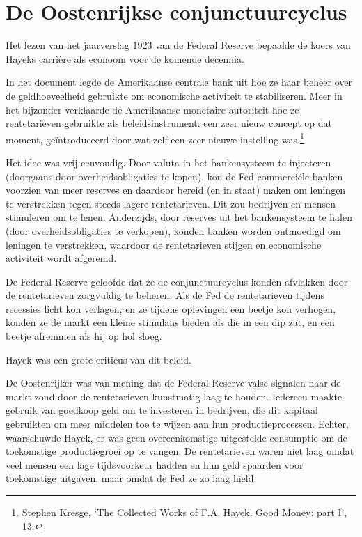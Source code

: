 \documentclass[
  a5paper,
  smalldemyvopaper,11pt,twoside,onecolumn,openright,extrafontsizes]{memoir}
\begin{document}
\section{De Oostenrijkse
conjunctuurcyclus}\label{de-oostenrijkse-conjunctuurcyclus}

Het lezen van het jaarverslag 1923 van de Federal Reserve bepaalde de
koers van Hayeks carrière als econoom voor de komende decennia.

In het document legde de Amerikaanse centrale bank uit hoe ze haar
beheer over de geldhoeveelheid gebruikte om economische activiteit te
stabiliseren. Meer in het bijzonder verklaarde de Amerikaanse monetaire
autoriteit hoe ze rentetarieven gebruikte als beleidsinstrument: een
zeer nieuw concept op dat moment, geïntroduceerd door wat zelf een zeer
nieuwe instelling was.\footnote{Stephen Kresge, `The Collected Works of
  F.A. Hayek, Good Money: part I', 13.}

Het idee was vrij eenvoudig. Door valuta in het bankensysteem te
injecteren (doorgaans door overheidsobligaties te kopen), kon de Fed
commerciële banken voorzien van meer reserves en daardoor bereid (en in
staat) maken om leningen te verstrekken tegen steeds lagere
rentetarieven. Dit zou bedrijven en mensen stimuleren om te lenen.
Anderzijds, door reserves uit het bankensysteem te halen (door
overheidsobligaties te verkopen), konden banken worden ontmoedigd om
leningen te verstrekken, waardoor de rentetarieven stijgen en
economische activiteit wordt afgeremd.

De Federal Reserve geloofde dat ze de conjunctuurcyclus konden afvlakken
door de rentetarieven zorgvuldig te beheren. Als de Fed de rentetarieven
tijdens recessies licht kon verlagen, en ze tijdens oplevingen een
beetje kon verhogen, konden ze de markt een kleine stimulans bieden als
die in een dip zat, en een beetje afremmen als hij op hol sloeg.

Hayek was een grote criticus van dit beleid.

De Oostenrijker was van mening dat de Federal Reserve valse signalen
naar de markt zond door de rentetarieven kunstmatig laag te houden.
Iedereen maakte gebruik van goedkoop geld om te investeren in bedrijven,
die dit kapitaal gebruikten om meer middelen toe te wijzen aan hun
productieprocessen. Echter, waarschuwde Hayek, er was geen
overeenkomstige uitgestelde consumptie om de toekomstige productiegroei
op te vangen. De rentetarieven waren niet laag omdat veel mensen een
lage tijdsvoorkeur hadden en hun geld spaarden voor toekomstige
uitgaven, maar omdat de Fed ze zo laag hield.
\end{document}
